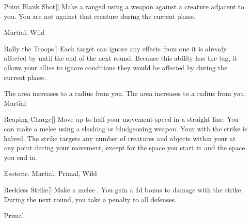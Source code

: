 \lowercase{\hypertarget{maneuver:Point Blank Shot}{}}\label{maneuver:Point Blank Shot}
\hypertarget{maneuver:Point Blank Shot}{}
\begin{freeability}[Rank 2]{Point Blank Shot}[]
Make a ranged  using a  weapon against a creature adjacent to you.
You are not  against that creature during the current phase.


 Martial, Wild
\end{freeability}
\vspace{0.25em}



\lowercase{\hypertarget{maneuver:Rally the Troops}{}}\label{maneuver:Rally the Troops}
\hypertarget{maneuver:Rally the Troops}{}
\begin{freeability}[Rank 2]{Rally the Troops}[]
Each target can ignore any effects from one  it is already affected by until the end of the next round.
Because this ability has the  tag, it allows your allies to ignore conditions they would be affected by during the current phase.

\rankline
{} The area increases to a \arealarge radius from you.
 The area increases to a \areahuge radius from you.
 Martial
\end{freeability}
\vspace{0.25em}



\lowercase{\hypertarget{maneuver:Reaping Charge}{}}\label{maneuver:Reaping Charge}
\hypertarget{maneuver:Reaping Charge}{}
\begin{freeability}[Rank 2]{Reaping Charge}[]
Move up to half your movement speed in a straight line.
You can make a melee  using a slashing or bludgeoning weapon.
Your  with the strike is halved.
The strike targets any number of creatures and objects within your  at any point during your movement, except for the space you start in and the space you end in.


 Esoteric, Martial, Primal, Wild
\end{freeability}
\vspace{0.25em}



\lowercase{\hypertarget{maneuver:Reckless Strike}{}}\label{maneuver:Reckless Strike}
\hypertarget{maneuver:Reckless Strike}{}
\begin{freeability}[Rank 2]{Reckless Strike}[]
Make a melee .
You gain a \plus1d bonus to damage with the strike.
During the next round, you take a  penalty to all defenses.


 Primal
\end{freeability}
\vspace{0.25em}



